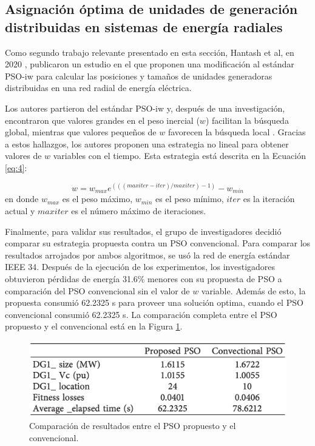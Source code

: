 \documentclass[letterpaper]{report}
\begin{document}
  \subsection{Asignación óptima de unidades de generación distribuidas en
    sistemas de energía radiales}
    Como segundo trabajo relevante presentado en esta sección, Hantash et al,
    en 2020 \cite{PSOEnergy}, publicaron un estudio en el que
    proponen una modificación al estándar PSO-iw para calcular las posiciones y
    tamaños de unidades generadoras distribuidas en una red radial de energía
    eléctrica. 

    Los autores partieron del estándar PSO-iw y, después de una investigación,
    encontraron que valores grandes en el peso inercial ($w$) facilitan la
    búsqueda global, mientras que valores pequeños de $w$ favorecen la búsqueda
    local \cite{CPSO, APSO2016}. Gracias a estos hallazgos, los autores proponen
    una estrategia no
    lineal para obtener valores de $w$ variables con el tiempo. Esta estrategia
    está descrita en la Ecuación \ref{eq:4}:

    \begin{equation}
      \label{eq:4}
      w = w_{max} e^{(((maxiter - iter) / maxiter) - 1)} - w_{min} 
    \end{equation}
    en donde $w_{max}$ es el peso máximo, $w_{min}$ es el peso mínimo, $iter$ es
    la iteración actual y $maxiter$ es el número máximo de iteraciones.

    Finalmente, para validar sus resultados, el grupo de investigadores
    decidió comparar su
    estrategia propuesta contra un PSO convencional. Para comparar los
    resultados arrojados por ambos algoritmos, se usó la red de energía estándar
    IEEE 34. Después de la ejecución de los experimentos, los investigadores
    obtuvieron pérdidas de energía 31.6\% menores con su propuesta de PSO a
    comparación del PSO convencional sin el valor de $w$ variable. Además de
    esto, la propuesta consumió 62.2325 s para proveer una solución optima,
    cuando el PSO convencional consumió 62.2325 s. La comparación completa
    entre el PSO propuesto y el convencional está en la Figura
    \ref{fig:pso-iw-variable-comp}.

    \begin{figure}[ht!]
      \includegraphics[width=\textwidth]{pso-iw-variable-comp.png}
      \centering
      \caption{Comparación de resultados entre el PSO propuesto y el
        convencional.}
      \label{fig:pso-iw-variable-comp}
      \centering
    \end{figure}
\end{document}

